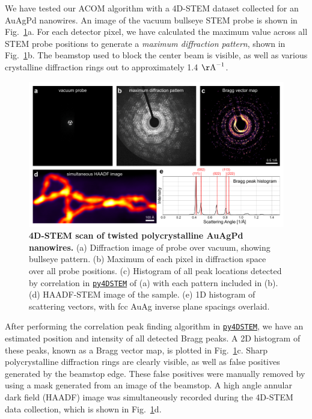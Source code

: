 \documentclass[%
 superscriptaddress,
 aip,
 amsmath,amssymb,
reprint,%
 author-year,%
longbibliography
]{revtex4-2}
\newcommand{\pyFDSTEM}{\href{https://github.com/py4dstem/py4DSTEM}{\texttt{py4DSTEM}}}
\begin{document}
We have tested our ACOM algorithm with a 4D-STEM dataset collected for an AuAgPd nanowires. An image of the vacuum bullseye STEM probe is shown in Fig.~\ref{Fig:exp_structure}a. For each detector pixel, we have calculated the maximum value across all STEM probe positions to generate a \emph{maximum diffraction pattern}, shown in Fig.~\ref{Fig:exp_structure}b. The beamstop used to block the center beam is visible, as well as various crystalline diffraction rings out to approximately 1.4 ${\rm{\AA}}^{-1}$. 


\begin{figure}[htbp]
    \centering
    \includegraphics[width=6.4 in]{figure_AuAg_exp_v01.pdf}
    \caption{{\bf 4D-STEM scan of twisted polycrystalline AuAgPd nanowires.} (a) Diffraction image of probe over vacuum, showing bullseye pattern. (b) Maximum of each pixel in diffraction space over all probe positions. (c) Histogram of all peak locations detected by correlation in \pyFDSTEM{} of (a) with each pattern included in (b). (d) HAADF-STEM image of the sample. (e) 1D histogram of scattering vectors, with fcc AuAg inverse plane spacings overlaid.}
    \label{Fig:exp_structure}
\end{figure}

After performing the correlation peak finding algorithm in \pyFDSTEM, we have an estimated position and intensity of all detected Bragg peaks. A 2D histogram of these peaks, known as a Bragg vector map, is plotted in Fig.~\ref{Fig:exp_structure}c. Sharp polycrystalline diffraction rings are clearly visible, as well as false positives generated by the beamstop edge. These false positives were manually removed by using a mask generated from an image of the beamstop. A high angle annular dark field (HAADF) image was simultaneously recorded during the 4D-STEM data collection, which is shown in Fig.~\ref{Fig:exp_structure}d.
\end{document}
